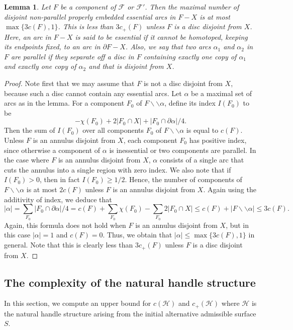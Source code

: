 \documentclass[oneside]{amsart}
\numberwithin{equation}{section}
\theoremstyle{plain}
\newtheorem{lemma}[equation]{Lemma}
\theoremstyle{definition}
\begin{document}
\begin{lemma}
\label{Lem:NumberArcs}
Let $F$ be a component of $\mathcal{F}$ or $\mathcal{F}'$. Then the maximal
number of disjoint non-parallel properly embedded essential arcs in $F - X$ is
at most $\max\{ 3c(F),1 \}$. This is less than $3c_+(F)$ unless $F$ is a disc disjoint from $X$. 
Here, an arc in $F - X$ is said to be essential if it cannot be homotoped,
keeping its endpoints fixed, to an arc in $\partial F - X$. Also, we say 
that two arcs $\alpha_1$ and $\alpha_2$ in $F$ are parallel if they separate off
a disc in $F$ containing exactly one copy of $\alpha_1$ and exactly one copy of
$\alpha_2$ and that is disjoint from $X$.
\end{lemma}

\begin{proof} Note first that we may assume that $F$ is not a disc
disjoint from $X$, because such a disc cannot contain any essential arcs.
Let $\alpha$ be a maximal set of arcs as in the lemma.
For a component $F_0$ of $F \backslash \backslash \alpha$, define its index $I(F_0)$ to be
$$-\chi(F_0) + 2|F_0 \cap X| + |F_0 \cap \partial \alpha|/4.$$
Then the sum of $I(F_0)$ over all components $F_0$ of $F \backslash \backslash \alpha$
is equal to $c(F)$. Unless $F$ is an annulus disjoint from $X$, each component $F_0$ has positive index, since
otherwise a component of $\alpha$ is inessential or two components
are parallel. In the case where $F$  is an annulus disjoint from $X$,
$\alpha$ consists of a single arc that cuts the annulus into a single region with zero index.
We also note that if $I(F_0) > 0$, then in fact $I(F_0) \geq 1/2$.
Hence, the number of components of $F \backslash \backslash \alpha$ is at most $2c(F)$
unless $F$ is an annulus disjoint from $X$.
Again using the additivity of index, we deduce that
$$|\alpha| = \sum_{F_0} |F_0 \cap \partial \alpha|/4 = c(F) + \sum_{F_0} \chi(F_0) - \sum_{F_0} 2 |F_0 \cap X| \leq c(F) + |F \backslash \backslash \alpha| \leq 3c(F).$$
Again, this formula does not hold when $F$ is an annulus disjoint from $X$, but in this case
$|\alpha| = 1$ and $c(F) = 0$. Thus, we obtain that $|\alpha| \leq \max\{ 3c(F),1 \}$ in general.
Note that this is clearly less than $3c_+(F)$ unless $F$ is a disc disjoint from $X$.
\end{proof}

\subsection{The complexity of the natural handle structure}
In this section, we compute an upper bound for $c(\mathcal{H})$ and $c_+(\mathcal{H})$ where
$\mathcal{H}$ is the natural handle structure arising from the initial alternative admissible surface $S$.
\end{document}

